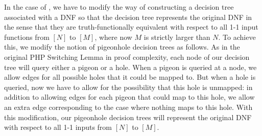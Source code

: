 In the case of \avoid, we have to modify the way of constructing a decision tree associated with a DNF so that the decision tree represents the original DNF in the sense that they are truth-functionally equivalent with respect to all 1-1 input functions from $[N]$ to $[M]$, where now $M$ is strictly larger than $N$. 
To achieve this, we modify the notion of pigeonhole decision trees as follows. As in the original PHP Switching Lemma in proof complexity, each node of our decision tree will query either a pigeon or a hole. When a pigeon is queried at a node, we allow edges for all possible holes that it could be mapped to. But when a hole is queried, now we have to allow for the possibility that this hole is unmapped: in addition to allowing edges for each pigeon that could map to this hole, we allow an extra edge corresponding to the case where nothing maps to this hole. With this modification, our pigeonhole decision trees will represent the original DNF with respect to all 1-1 inputs from $[N]$ to $[M]$. 

